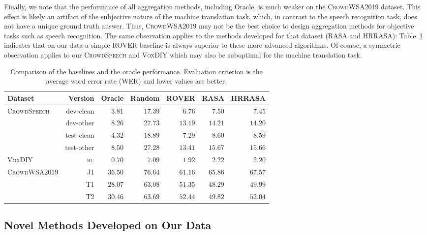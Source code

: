 \documentclass{article}
\newcommand{\speech}{\textsc{CrowdSpeech}}
\newcommand{\vox}{\textsc{VoxDIY}}
\newcommand{\crowd}{\textsc{CrowdWSA2019}}
\begin{document}
Finally, we note that the performance of all aggregation methods, including Oracle, is much weaker on the \crowd{} dataset. This effect is likely an artifact of the subjective nature of the machine translation task, which, in contrast to the speech recognition task, does not have a unique ground truth answer. Thus, 
\crowd{} may not be the best choice to design aggregation methods for objective tasks such as speech recognition. The same observation applies to the methods developed for that dataset (RASA and HRRASA): Table~\ref{tab:comparison} indicates that on our data a simple ROVER baseline is always superior to these more advanced algorithms. Of course, a symmetric observation applies to our \speech{} and \vox{} which may also be suboptimal for the machine translation task. 

\begin{table}[t]
\centering
\caption{\label{tab:comparison}Comparison of the baselines and the oracle performance. Evaluation criterion is the average word error rate (WER) and lower values are better.}
\begin{tabular}{lrrrrrr}\toprule
\textbf{Dataset} & \textbf{Version} & \textbf{Oracle} & \textbf{Random} &  \textbf{ROVER} & \textbf{RASA} & \textbf{HRRASA} \\\midrule
\multirow{4}{*}{\speech}
& dev-clean & $3.81$ & $17.39$ &  $6.76$ & $7.50$ & $7.45$ \\
& dev-other & $8.26$ & $27.73$ & $13.19$ & $14.21$ & $14.20$ \\
& test-clean & $4.32$ & $18.89$ &  $7.29$ & $8.60$ & $8.59$ \\
& test-other &  $8.50$ & $27.28$ &$13.41$ & $15.67$ & $15.66$ \\\midrule
{\vox} & \textsc{ru} & $0.70$ & $7.09$ &  $1.92$ & $2.22$ & $2.20$ \\\midrule
\multirow{3}{*}{\crowd} & J1 & $36.50$ & $76.64$ &  $61.16$ & $65.86$ & $67.57$ \\
& T1 & $28.07$ & $63.08$ &  $51.35$ & $48.29$ & $49.99$\\
& T2 & $30.46$ & $63.69$ &  $52.44$ & $49.82$ & $52.04$ \\\bottomrule
\end{tabular}
\end{table}


\subsection{Novel Methods Developed on Our Data}
\label{section:st}
\end{document}
